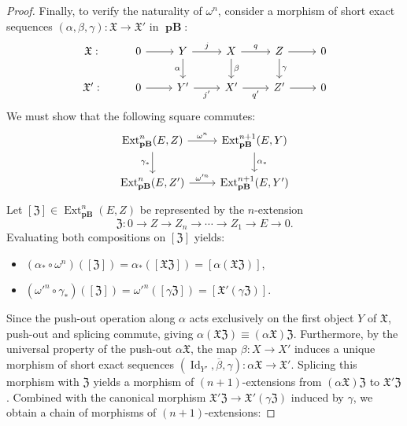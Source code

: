 \documentclass[12pt,a4paper]{amsproc}
\theoremstyle{remark}
\theoremstyle{definition}
\newcommand{\Ext}{\operatorname{Ext}}
\newcommand{\pBan}{\operatorname{\textbf{pB}}}
\newcommand{\Id}{\operatorname{Id}}
\numberwithin{equation}{section}
\begin{document}
\begin{proof}
\par Finally, to verify the naturality of $\omega^n$, consider a morphism of short exact sequences $(\alpha, \beta, \gamma): \mathfrak{X} \to \mathfrak{X}'$ in $\boldsymbol{\pBan}$:
\begin{equation}\notag
	\begin{tikzcd}
		\mathfrak{X}: & 0 \arrow[r] & Y \arrow[r, "j"] \arrow[d, "\alpha"'] & X \arrow[r, "q"] \arrow[d, "\beta"] & Z \arrow[r] \arrow[d, "\gamma"] & 0 \\
		\mathfrak{X}': & 0 \arrow[r] & Y' \arrow[r, "j'"'] & X' \arrow[r, "q'"'] & Z' \arrow[r] & 0
	\end{tikzcd}
\end{equation}
We must show that the following square commutes:
\begin{equation}\notag
	\begin{tikzcd}
		{\Ext_{\boldsymbol{\pBan}}^n(E,Z)} \arrow[r, "\omega^n"] \arrow[d, "\gamma_*"'] & {\Ext_{\boldsymbol{\pBan}}^{n+1}(E,Y)} \arrow[d, "\alpha_*"] \\
		{\Ext_{\boldsymbol{\pBan}}^n(E,Z')} \arrow[r, "\omega'^n"] & {\Ext_{\boldsymbol{\pBan}}^{n+1}(E,Y')}
	\end{tikzcd}
\end{equation}
Let $[\mathfrak{Z}] \in \Ext^n_{\boldsymbol{\pBan}}(E,Z)$ be represented by the $n$-extension 
\[ \mathfrak{Z}: 0 \to Z \to Z_n \to \cdots \to Z_1 \to E \to 0.\]
Evaluating both compositions on $[\mathfrak{Z}]$ yields:
\begin{itemize}
	\item $(\alpha_* \circ \omega^n)([\mathfrak{Z}]) = \alpha_*([\mathfrak{X} \mathfrak{Z}]) = [\alpha(\mathfrak{X} \mathfrak{Z})]$,
	\item $(\omega'^n \circ \gamma_*)([\mathfrak{Z}]) = \omega'^n([\gamma\mathfrak{Z}]) = [\mathfrak{X}' (\gamma\mathfrak{Z})]$.
\end{itemize}
Since the push-out operation along $\alpha$ acts exclusively on the first object $Y$ of $\mathfrak{X}$, push-out and splicing commute, giving $\alpha(\mathfrak{X} \mathfrak{Z}) \equiv (\alpha\mathfrak{X}) \mathfrak{Z}$. Furthermore, by the universal property of the push-out $\alpha\mathfrak{X}$, the map $\beta: X \to X'$ induces a unique morphism of short exact sequences $(\Id_{Y'}, \overline{\beta}, \gamma): \alpha\mathfrak{X} \to \mathfrak{X}'$. Splicing this morphism with $\mathfrak{Z}$ yields a morphism of $(n+1)$-extensions from $(\alpha\mathfrak{X}) \mathfrak{Z}$ to $\mathfrak{X}' \mathfrak{Z}$. Combined with the canonical morphism $\mathfrak{X}' \mathfrak{Z} \to \mathfrak{X}' (\gamma\mathfrak{Z})$ induced by $\gamma$, we obtain a chain of morphisms of $(n+1)$-extensions:

\end{proof}
\end{document}
